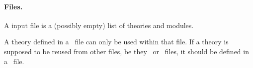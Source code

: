 \paragraph{Files.}
A \whyml input file is a (possibly empty) list of theories and modules.
\begin{center}\framebox{}\end{center}
A theory defined in a \whyml\ file can only be used within that
file. If a theory is supposed to be reused from other files, be they
\why\ or \whyml\ files, it should be defined in a \why\ file.

